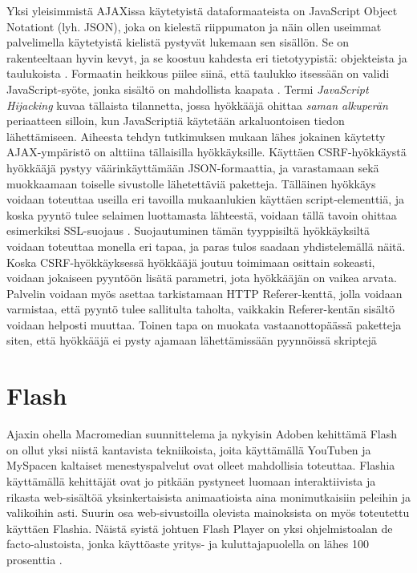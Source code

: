 Yksi yleisimmistä AJAXissa käytetyistä dataformaateista on JavaScript Object Notationt (lyh. JSON), joka on kielestä riippumaton ja näin ollen useimmat palvelimella käytetyistä kielistä 
pystyvät lukemaan sen sisällön. Se on rakenteeltaan hyvin kevyt, ja se koostuu kahdesta eri tietotyypistä: objekteista ja taulukoista \cite{JSON}. Formaatin heikkous piilee siinä, että 
taulukko itsessään on validi JavaScript-syöte, jonka sisältö on mahdollista kaapata \cite{AJAX}. Termi \emph{JavaScript Hijacking} kuvaa tällaista tilannetta, jossa hyökkääjä ohittaa 
\emph{saman alkuperän} periaatteen silloin, kun JavaScriptiä käytetään arkaluontoisen tiedon lähettämiseen. Aiheesta tehdyn tutkimuksen \cite{JSH} mukaan lähes jokainen käytetty AJAX-ympäristö
on alttiina tällaisilla hyökkäyksille. Käyttäen CSRF-hyökkäystä hyökkääjä pystyy väärinkäyttämään JSON-formaattia, ja varastamaan sekä muokkaamaan toiselle sivustolle lähetettäviä paketteja. 
Tälläinen hyökkäys voidaan toteuttaa useilla eri tavoilla mukaanlukien käyttäen script-elementtiä, ja koska pyyntö tulee selaimen luottamasta lähteestä, voidaan tällä tavoin ohittaa esimerkiksi 
SSL-suojaus \cite{AJAX}. Suojautuminen tämän tyyppisiltä hyökkäyksiltä voidaan toteuttaa monella eri tapaa, ja paras tulos saadaan yhdistelemällä näitä. Koska CSRF-hyökkäyksessä hyökkääjä joutuu 
toimimaan osittain  sokeasti, voidaan jokaiseen pyyntöön lisätä parametri, jota hyökkääjän on vaikea arvata. Palvelin voidaan myös asettaa tarkistamaan HTTP Referer-kenttä, jolla voidaan varmistaa, 
että pyyntö tulee sallitulta taholta, vaikkakin Referer-kentän sisältö voidaan helposti muuttaa. Toinen tapa on muokata vastaanottopäässä paketteja siten, että hyökkääjä ei pysty ajamaan lähettämissään 
pyynnöissä skriptejä \cite{JSH}

\section{Flash}

Ajaxin ohella Macromedian suunnittelema ja nykyisin Adoben kehittämä Flash on ollut yksi niistä kantavista tekniikoista, joita käyttämällä YouTuben ja MySpacen kaltaiset menestyspalvelut ovat olleet 
mahdollisia toteuttaa. Flashia käyttämällä kehittäjät ovat jo pitkään pystyneet luomaan interaktiivista ja rikasta web-sisältöä yksinkertaisista animaatioista aina monimutkaisiin peleihin ja
valikoihin asti. Suurin osa web-sivustoilla olevista mainoksista on myös toteutettu käyttäen Flashia. Näistä syistä johtuen Flash Player on yksi ohjelmistoalan de facto-alustoista, jonka käyttöaste 
yritys- ja kuluttajapuolella on lähes 100 prosenttia \cite{Flash}. 

